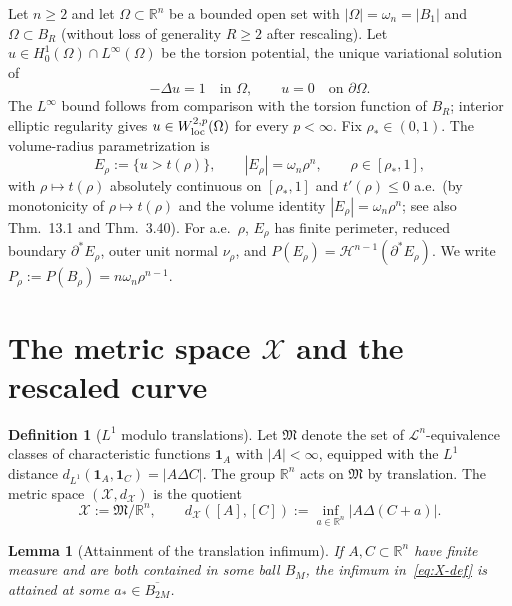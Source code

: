 \documentclass[11pt]{article}
\newtheorem{lemma}[theorem]{Lemma}
\theoremstyle{definition}
\newtheorem{definition}[theorem]{Definition}
\newcommand{\R}{\mathbb{R}}
\newcommand{\Om}{\Omega}
\newcommand{\rstar}{\rho_{*}}
\newcommand{\X}{\mathcal X}
\begin{document}
Let $n\ge 2$ and let $\Om\subset\R^n$ be a bounded open set with
$|\Om|=\omega_n=|B_1|$ and $\Om\subset B_R$ (without loss of generality
$R\ge 2$ after rescaling). Let
$u\in H^1_0(\Om)\cap L^\infty(\Om)$ be the torsion potential, the unique
variational solution of
\[
   -\Delta u=1\quad\text{in }\Om,\qquad u=0\quad\text{on }\partial\Om.
\]
The $L^\infty$ bound follows from comparison with the torsion function of
$B_R$; interior elliptic regularity gives $u\in W^{2,p}_{\rm loc}(\Om)$ for
every $p<\infty$. Fix $\rstar\in(0,1)$.
The volume-radius parametrization is
\begin{equation}\label{eq:rho-param}
   E_\rho:=\{u>t(\rho)\},\qquad |E_\rho|=\omega_n\rho^n,\qquad
   \rho\in[\rstar,1],
\end{equation}
with $\rho\mapsto t(\rho)$ absolutely continuous on $[\rstar,1]$ and
$t'(\rho)\le 0$ a.e.\ (by monotonicity of $\rho\mapsto t(\rho)$ and the
volume identity $|E_\rho|=\omega_n\rho^n$; see also \cite{Maggi2012}
Thm.~13.1 and \cite{AFP2000} Thm.~3.40). For a.e.\ $\rho$, $E_\rho$ has finite
perimeter, reduced boundary $\partial^*E_\rho$, outer unit normal $\nu_\rho$,
and $P(E_\rho)=\mathcal H^{n-1}(\partial^*E_\rho)$. We write
$P_\rho:=P(B_\rho)=n\omega_n\rho^{n-1}$.

\section{The metric space $\X$ and the rescaled curve}\label{sec:X}

\begin{definition}[$L^1$ modulo translations]\label{def:X}
Let $\mathfrak M$ denote the set of $\mathcal L^n$-equivalence classes of
characteristic functions $\mathbf 1_A$ with $|A|<\infty$, equipped with the
$L^1$ distance $d_{L^1}(\mathbf 1_A,\mathbf 1_C)=|A\Delta C|$. The group
$\R^n$ acts on $\mathfrak M$ by translation. The metric space
$(\X,d_\X)$ is the quotient
\begin{equation}\label{eq:X-def}
   \X:=\mathfrak M/\R^n,\qquad
   d_\X([A],[C]):=\inf_{a\in\R^n}|A\Delta(C+a)|.
\end{equation}
\end{definition}

\begin{lemma}[Attainment of the translation infimum]\label{lem:attain}
If $A,C\subset\R^n$ have finite measure and are both contained in some ball
$B_M$, the infimum in~\eqref{eq:X-def} is attained at some
$a_*\in\overline{B_{2M}}$.
\end{lemma}
\end{document}
